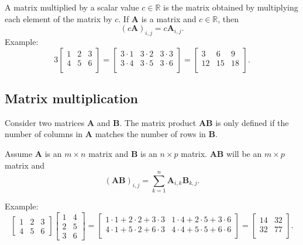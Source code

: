 \documentclass[
]{book}
\theoremstyle{definition}
\theoremstyle{definition}
\theoremstyle{definition}
\theoremstyle{definition}
\theoremstyle{remark}
\begin{document}
A matrix multiplied by a scalar value \(c\in\mathbb{R}\) is the matrix obtained by multiplying each element of the matrix by \(c\). If \(\mathbf{A}\) is a matrix and \(c\in \mathbb{R}\), then
\[(c\mathbf{A})_{i,j} = c\mathbf{A}_{i,j}.\]
Example:
\[
3\begin{bmatrix}
1 & 2 & 3 \\
4 & 5 & 6 \\
\end{bmatrix}=
\begin{bmatrix}
3\cdot 1 & 3\cdot 2 & 3\cdot 3 \\
3\cdot 4 & 3\cdot 5 & 3\cdot 6 \\
\end{bmatrix}=
\begin{bmatrix}
3 & 6 & 9 \\
12 & 15 & 18 \\
\end{bmatrix}.
\]

\hypertarget{matrix-multiplication}{%
\subsection{Matrix multiplication}\label{matrix-multiplication}}

Consider two matrices \(\mathbf{A}\) and \(\mathbf{B}\). The matrix product \(\mathbf{AB}\) is only defined if the number of columns in \(\mathbf{A}\) matches the number of rows in \(\mathbf{B}\).

Assume \(\mathbf{A}\) is an \(m\times n\) matrix and \(\mathbf{B}\) is an \(n\times p\) matrix. \(\mathbf{AB}\) will be an \(m\times p\) matrix and \[(\mathbf{AB})_{i,j} = \sum_{k=1}^{n} \mathbf{A}_{i,k}\mathbf{B}_{k,j}.\]

Example:
\[
\begin{bmatrix}
1 & 2 & 3 \\
4 & 5 & 6
\end{bmatrix}
\begin{bmatrix}
1 & 4\\
2 & 5\\
3 & 6
\end{bmatrix}=
\begin{bmatrix}
1\cdot 1 +  2 \cdot 2 + 3 \cdot 3 & 1 \cdot 4 + 2 \cdot 5 + 3 \cdot 6\\
4\cdot 1 +  5 \cdot 2 + 6 \cdot 3 & 4 \cdot 4 + 5 \cdot 5 + 6 \cdot 6\\
\end{bmatrix}=
\begin{bmatrix}
14 & 32\\
32 & 77\\
\end{bmatrix}.
\]
\end{document}
